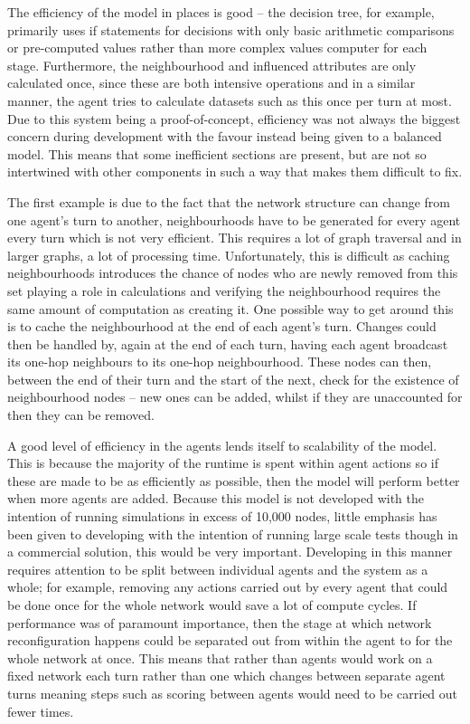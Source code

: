 \documentclass[]{report}
\begin{document}
The efficiency of the model in places is good – the decision tree, for example, primarily uses if statements for decisions with only basic arithmetic comparisons or pre-computed values rather than more complex values computer for each stage. Furthermore, the neighbourhood and influenced attributes are only calculated once, since these are both intensive operations and in a similar manner, the agent tries to calculate datasets such as this once per turn at most.  Due to this system being a proof-of-concept, efficiency was not always the biggest concern during development with the favour instead being given to a balanced model. This means that some inefficient sections are present, but are not so intertwined with other components in such a way that makes them difficult to fix.   

The first example is due to the fact that the network structure can change from one agent's turn to another, neighbourhoods have to be generated for every agent every turn which is not very efficient. This requires a lot of graph traversal and in larger graphs, a lot of processing time. Unfortunately, this is difficult as caching neighbourhoods introduces the chance of nodes who are newly removed from this set playing a role in calculations and verifying the neighbourhood requires the same amount of computation as creating it. One possible way to get around this is to cache the neighbourhood at the end of each agent's turn. Changes could then be handled by, again at the end of each turn, having each agent broadcast its one-hop neighbours to its one-hop neighbourhood. These nodes can then, between the end of their turn and the start of the next, check for the existence of neighbourhood nodes – new ones can be added, whilst if they are unaccounted for then they can be removed.

A good level of efficiency in the agents lends itself to scalability of the model. This is because the majority of the runtime is spent within agent actions so if these are made to be as efficiently as possible, then the model will perform better when more agents are added. Because this model is not developed with the intention of running simulations in excess of 10,000 nodes, little emphasis has been given to developing with the intention of running large scale tests though in a commercial solution, this would be very important. Developing in this manner requires attention to be split between individual agents and the system as a whole; for example, removing any actions carried out by every agent that could be done once for the whole network would save a lot of compute cycles. If performance was of paramount importance, then the stage at which network reconfiguration happens could be separated out from within the agent to for the whole network at once. This means that rather than agents would work on a fixed network each turn rather than one which changes between separate agent turns meaning steps such as scoring between agents would need to be carried out fewer times.
\end{document}
